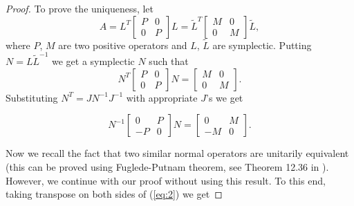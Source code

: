 \documentclass[12pt,a4paper,twoside]{article}
\numberwithin{equation}{section}
\theoremstyle{definition}  %
\theoremstyle{plain}  %
\theoremstyle{remark} %
\begin{document}
\begin{proof}
To prove the uniqueness,  let 
\begin{equation*}
    A =L^{T}\begin{bmatrix}
              P & 0  \\
               0  & P
             \end{bmatrix} L
      = \tilde{L}^{T} \begin{bmatrix}
              M & 0  \\
              0 & M
             \end{bmatrix} \tilde{L},
  \end{equation*} where $P$,  $M$ are two positive operators and $L$, $\tilde{L}$ are symplectic.
 Putting $N=L\tilde{L}^{-1}$ we get a symplectic $N$ such that
\begin{equation*}
   N^{T} \begin{bmatrix}
              P & 0  \\
               0                     & P
             \end{bmatrix} N
      =  \begin{bmatrix}
              M & 0  \\
              0 & M
             \end{bmatrix}.
\end{equation*}
Substituting $N^{T} = JN^{-1}J^{-1}$ with appropriate $J$'s we get

\begin{equation}\label{eq:2}
  N^{-1}\begin{bmatrix}
              0 &  P   \\
               - P & 0
             \end{bmatrix} N
    = \begin{bmatrix}
              0 & M  \\
              -M & 0
             \end{bmatrix}.
\end{equation}

 Now we recall the fact that two similar normal operators are unitarily equivalent (this can be proved using Fuglede-Putnam theorem, see Theorem 12.36 in \cite{Rud91}). However, we continue with our proof without using this result. To this end, taking transpose on both sides of (\ref{eq:2}) we get


\end{proof}
\end{document}
